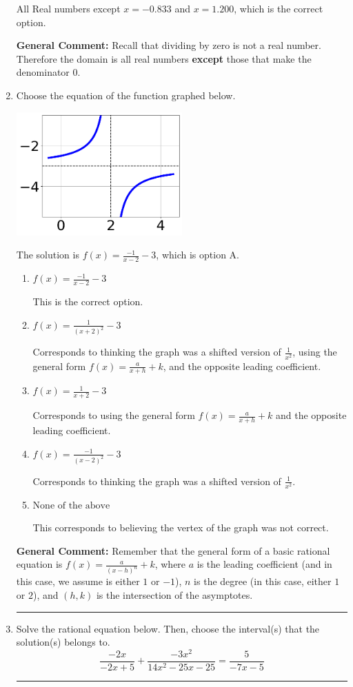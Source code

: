\documentclass{extbook}[14pt]
\newcommand{\litem}[1]{\item #1

\rule{\textwidth}{0.4pt}}
\begin{document}
\begin{enumerate}
{\begin{enumerate}[label=\Alph*.]
All Real numbers except $x = -0.833$ and $x = 1.200$, which is the correct option.
\end{enumerate}

\textbf{General Comment:} Recall that dividing by zero is not a real number. Therefore the domain is all real numbers \textbf{except} those that make the denominator 0.
}
\litem{
Choose the equation of the function graphed below.

\begin{center}
    \includegraphics[width=0.5\textwidth]{../Figures/rationalGraphToEquationB.png}
\end{center}




The solution is \( f(x) = \frac{-1}{x - 2} - 3 \), which is option A.\begin{enumerate}[label=\Alph*.]
\item \( f(x) = \frac{-1}{x - 2} - 3 \)

This is the correct option.
\item \( f(x) = \frac{1}{(x + 2)^2} - 3 \)

Corresponds to thinking the graph was a shifted version of $\frac{1}{x^2}$, using the general form $f(x) = \frac{a}{x+h}+k$, and the opposite leading coefficient.
\item \( f(x) = \frac{1}{x + 2} - 3 \)

Corresponds to using the general form $f(x) = \frac{a}{x+h}+k$ and the opposite leading coefficient.
\item \( f(x) = \frac{-1}{(x - 2)^2} - 3 \)

Corresponds to thinking the graph was a shifted version of $\frac{1}{x^2}$.
\item \( \text{None of the above} \)

This corresponds to believing the vertex of the graph was not correct.
\end{enumerate}

\textbf{General Comment:} Remember that the general form of a basic rational equation is $ f(x) = \frac{a}{(x-h)^n} + k$, where $a$ is the leading coefficient (and in this case, we assume is either $1$ or $-1$), $n$ is the degree (in this case, either $1$ or $2$), and $(h, k)$ is the intersection of the asymptotes.
}
\litem{
Solve the rational equation below. Then, choose the interval(s) that the solution(s) belongs to.
\[ \frac{-2x}{-2x + 5} + \frac{-3x^{2}}{14x^{2} -25 x -25} = \frac{5}{-7x -5} \]

}
\end{enumerate}
\end{document}
